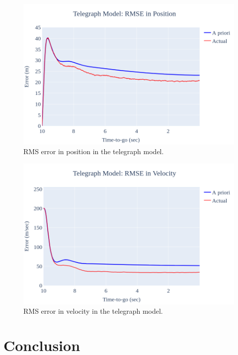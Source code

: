 \documentclass{article}
\begin{document}
\begin{figure}
    \centering
    \includegraphics[width=1\textwidth]{rmse_tele_pos.png}
    \caption{RMS error in position in the telegraph model.}
    \label{rmse_tele_pos}
\end{figure}

\begin{figure}
    \centering
    \includegraphics[width=1\textwidth]{rmse_tele_vel.png}
    \caption{RMS error in velocity in the telegraph model.}
    \label{rmse_tele_vel}
\end{figure}

\section{Conclusion}
\end{document}
